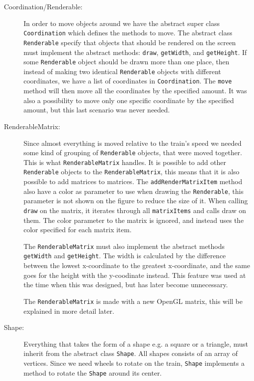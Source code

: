 \begin{description}
\item[Coordination/Renderable:] In order to move objects around we have the abstract super class \lstinline|Coordination| which defines the methods to move. The abstract class \lstinline|Renderable| specify that objects that should be rendered on the screen must implement the abstract methods: \lstinline|draw|, \lstinline|getWidth|, and \lstinline|getHeight|. If some \lstinline|Renderable| object should be drawn more than one place, then instead of making two identical \lstinline|Renderable| objects with different coordinates, we have a list of coordinates in \lstinline|Coordination|. The \lstinline|move| method will then move all the coordinates by the specified amount. It was also a possibility to move only one specific coordinate by the specified amount, but this last scenario was never needed.

\item[RenderableMatrix:] Since almost everything is moved relative to the train's speed we needed some kind of grouping of \lstinline|Renderable| objects, that were moved together. This is what \lstinline|RenderableMatrix| handles. It is possible to add other \lstinline|Renderable| objects to the \lstinline|RenderableMatrix|, this means that it is also possible to add matrices to matrices. The \lstinline|addRenderMatrixItem| method also have a color as parameter to use when drawing the \lstinline|Renderable|, this parameter is not shown on the figure to reduce the size of it. When calling \lstinline|draw| on the matrix, it iterates through all \lstinline|matrixItems| and calls draw on them. The color parameter to the matrix is ignored, and instead uses the color specified for each matrix item.

The \lstinline|RenderableMatrix| must also implement the abstract methods \lstinline|getWidth| and \lstinline|getHeight|. The width is calculated by the difference between the lowest x-coordinate to the greatest x-coordinate, and the same goes for the height with the y-coodinate instead. This feature was used at the time when this was designed, but has later become unnecessary.

The \lstinline|RenderableMatrix| is made with a new OpenGL matrix, this will be explained in more detail later.

\item[Shape:] Everything that takes the form of a shape e.g. a square or a triangle, must inherit from the abstract class \lstinline|Shape|. All shapes consists of an array of vertices. Since we need wheels to rotate on the train, \lstinline|Shape| implements a method to rotate the \lstinline|Shape| around its center.


\end{description}
